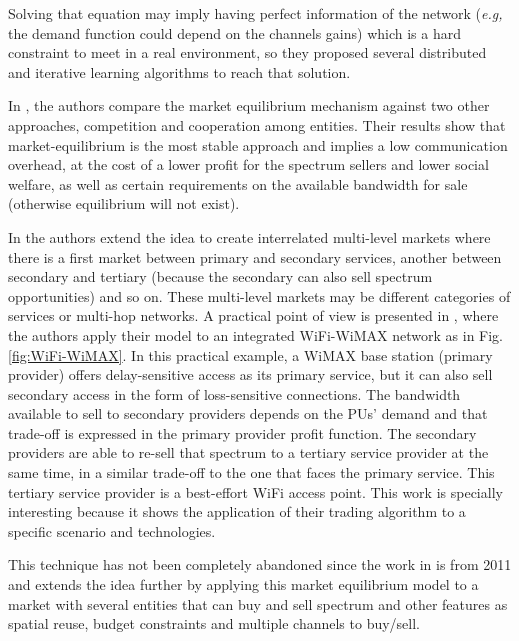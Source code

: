 Solving that equation may imply having perfect information of the network (\textit{e.g,} the demand function could depend on the channels gains) which is a hard constraint to meet in a real environment, so they proposed several distributed and iterative learning algorithms to reach that solution. 

In \cite{ref:Niyato2008_Mark}, the authors compare the market equilibrium mechanism against two other approaches, competition and cooperation among entities.
Their results show that market-equilibrium is the most stable approach and implies a low communication overhead, at the cost of a lower profit for the spectrum sellers and lower social welfare, as well as certain requirements on the available bandwidth for sale (otherwise equilibrium will not exist).

In \cite{ref:Niyato2007_Hier} the authors extend the idea to create interrelated multi-level markets where there is a first market between primary and secondary services, another between secondary and tertiary (because the secondary can also sell spectrum opportunities) and so on. These multi-level markets may be different categories of services or multi-hop networks. A practical point of view is presented in \cite{ref:Niyato2010}, where the authors apply their model to an integrated WiFi-WiMAX network as in Fig. \ref{fig:WiFi-WiMAX}. In this practical example, a WiMAX base station (primary provider) offers delay-sensitive access as its primary service, but it can also sell secondary access in the form of loss-sensitive connections. The bandwidth available to sell to secondary providers depends on the PUs' demand and that trade-off is expressed in the primary provider profit function. The secondary providers are able to re-sell that spectrum to a tertiary service provider at the same time, in a similar trade-off to the one that faces the primary service. This tertiary service provider is a best-effort WiFi access point. This work is specially interesting because it shows the application of their trading algorithm to a specific scenario and technologies. 

This technique has not been completely abandoned since the work in \cite{ref:Xu2011} is from 2011 and extends the idea further by applying this market equilibrium model to a market with several entities that can buy and sell spectrum and other features as spatial reuse, budget constraints and multiple channels to buy/sell.

